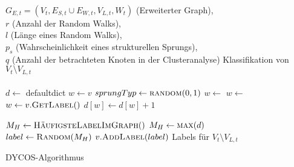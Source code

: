 \begin{algorithm}
    \begin{algorithmic}[1]
        \Require \\$G_{E,t} = (V_t, E_{S,t} \cup E_{W,t}, V_{L,t}, W_t)$ (Erweiterter Graph),\\
                 $r$ (Anzahl der Random Walks),\\
                 $l$ (Länge eines Random Walks),\\
                 $p_s$ (Wahrscheinlichkeit eines strukturellen Sprungs),\\
                 $q$ (Anzahl der betrachteten Knoten in der Clusteranalyse)
        \Ensure  Klassifikation von $V_t \setminus V_{L,t}$\\
        \\

            \State $d \gets $ defaultdict
                \State $w \gets v$
                    \State $sprungTyp \gets \Call{random}{0, 1}$
                        \State $w \gets$ 
                    \Else
                        \State $w \gets$ 
                    \EndIf
                    \State $w \gets v.\Call{GetLabel}{ }$ 
                    \State $d[w] \gets d[w] + 1$
                \EndFor
            \EndFor

             
                \State $M_H \gets \Call{HäufigsteLabelImGraph}{ }$
            \Else
                \State $M_H \gets \Call{max}{d}$
            \EndIf
            \\
            \State {}
            \State $label \gets \Call{Random}{M_H}$ 
            \State $v.\Call{AddLabel}{label}$ 
        \EndFor
        \State \Return Labels für $V_t \setminus V_{L,t}$
    \end{algorithmic}
\caption{DYCOS-Algorithmus}
\label{alg:DYCOS}
\end{algorithm}

